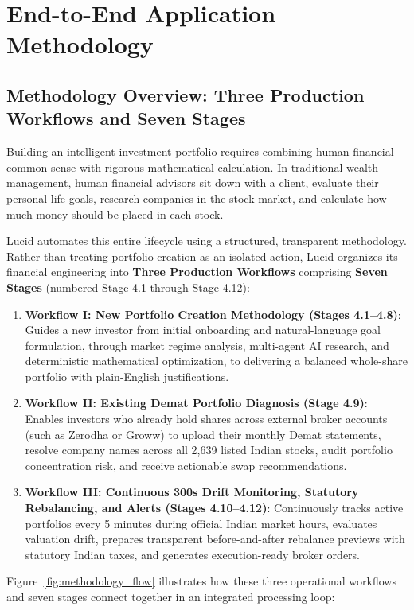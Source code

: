 \section{End-to-End Application Methodology}
\label{sec:methodology}
\label{ch:methodology}

\subsection{Methodology Overview: Three Production Workflows and Seven Stages}
Building an intelligent investment portfolio requires combining human financial common sense with rigorous mathematical calculation. In traditional wealth management, human financial advisors sit down with a client, evaluate their personal life goals, research companies in the stock market, and calculate how much money should be placed in each stock.

Lucid automates this entire lifecycle using a structured, transparent methodology. Rather than treating portfolio creation as an isolated action, Lucid organizes its financial engineering into \textbf{Three Production Workflows} comprising \textbf{Seven Stages} (numbered Stage 4.1 through Stage 4.12):
\begin{enumerate}
    \item \textbf{Workflow I: New Portfolio Creation Methodology (Stages 4.1--4.8)}: Guides a new investor from initial onboarding and natural-language goal formulation, through market regime analysis, multi-agent AI research, and deterministic mathematical optimization, to delivering a balanced whole-share portfolio with plain-English justifications.
    \item \textbf{Workflow II: Existing Demat Portfolio Diagnosis (Stage 4.9)}: Enables investors who already hold shares across external broker accounts (such as Zerodha or Groww) to upload their monthly Demat statements, resolve company names across all 2,639 listed Indian stocks, audit portfolio concentration risk, and receive actionable swap recommendations.
    \item \textbf{Workflow III: Continuous 300s Drift Monitoring, Statutory Rebalancing, and Alerts (Stages 4.10--4.12)}: Continuously tracks active portfolios every 5 minutes during official Indian market hours, evaluates valuation drift, prepares transparent before-and-after rebalance previews with statutory Indian taxes, and generates execution-ready broker orders.
\end{enumerate}

Figure~\ref{fig:methodology_flow} illustrates how these three operational workflows and seven stages connect together in an integrated processing loop:

